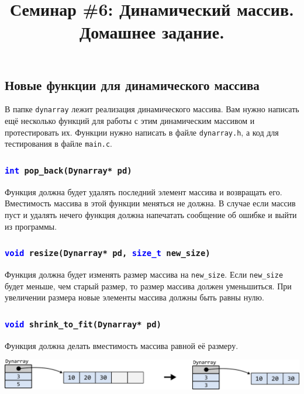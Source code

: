 \documentclass[10pt]{article}
\begin{document}
\title{Семинар \#6: Динамический массив. Домашнее задание.\vspace{-5ex}}\date{}\maketitle

\subsection{Новые функции для динамического массива}
В папке \texttt{dynarray} лежит реализация динамического массива. Вам нужно написать ещё несколько функций для работы с этим динамическим массивом и протестировать их. Функции нужно написать в файле \texttt{dynarray.h}, а код для тестирования в файле \texttt{main.c}.



\subsubsection{\texttt{\textcolor{blue}{int} pop\_back(Dynarray* pd)}}
Функция должна будет удалять последний элемент массива и возвращать его. Вместимость массива в этой функции меняться не должна. В случае если массив пуст и удалять нечего функция должна напечатать сообщение об ошибке и выйти из программы.


\subsubsection{\texttt{\textcolor{blue}{void} resize(Dynarray* pd, \textcolor{blue}{size\_t} new\_size)}}
Функция должна будет изменять размер массива на \texttt{new\_size}. Если \texttt{new\_size} будет меньше, чем старый размер, то размер массива должен уменьшиться. При увеличении размера новые элементы массива должны быть равны нулю.


\subsubsection{\texttt{\textcolor{blue}{void} shrink\_to\_fit(Dynarray* pd)}}
Функция должна делать вместимость массива равной её размеру.\\
\begin{center}
\includegraphics[scale=1]{../images/dynarray_shrink_to_fit.png}
\end{center}
\end{document}
